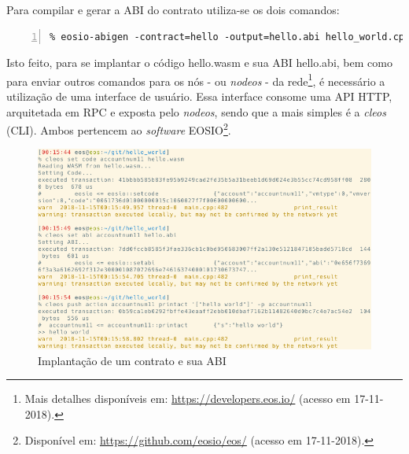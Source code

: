 \documentclass[a4paper,12pt]{monografia}
\theoremstyle{plain}
\theoremstyle{definition}
\theoremstyle{remark}
\begin{document}
Para compilar e gerar a ABI do contrato utiliza-se os dois comandos:

\lstset{tabsize=5,language=sh,showstringspaces=false,basicstyle=\ttfamily\small,keywordstyle=\bf,breaklines=true}
\begin{singlespacing}
\begin{lstlisting}[frame=single,framexrightmargin=1pt,numbers=left]
% eosio-cpp -contract=hello -o=hello.wasm hello_world.cpp
% eosio-abigen -contract=hello -output=hello.abi hello_world.cpp
\end{lstlisting}
\end{singlespacing}

Isto feito, para se implantar o c\'odigo hello.wasm e sua ABI hello.abi, bem como para enviar outros comandos para os n\'os - ou \textit{nodeos} - da rede\footnote{Mais detalhes dispon\'iveis em: \url{https://developers.eos.io/} (acesso em 17-11-2018).}, \'e necess\'ario a utiliza\c{c}\~ao de uma interface de usu\'ario.
Essa interface consome uma API HTTP, arquitetada em RPC e exposta pelo \textit{nodeos}, sendo que a mais simples \'e a \textit{cleos} (CLI).
Ambos pertencem ao \textit{software} EOSIO\footnote{Dispon\'ivel em: \url{https://github.com/eosio/eos/} (acesso em 17-11-2018).}.

\begin{figure}[ht]
 \begin{center}
   \includegraphics[width=160mm,scale=1.0]{./figs/cleos.png}
   \caption{Implanta\c{c}\~ao de um contrato e sua ABI}
   \label{fig:cleos}
 \end{center}
\end{figure}
\end{document}
